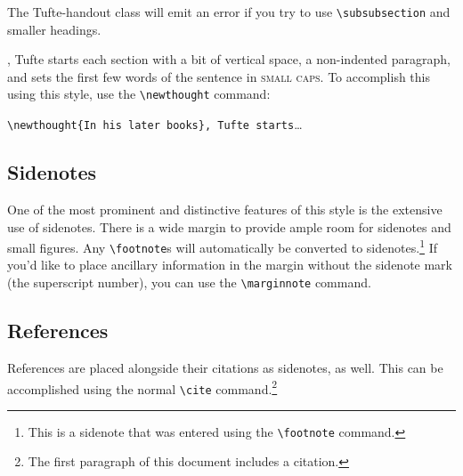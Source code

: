 \documentclass[nofonts]{tufte-handout}
\begin{document}
The Tufte-handout class will emit an error if you try to use
\Verb|\subsubsection| and smaller headings.


,\cite{Tufte2006} Tufte
starts each section with a bit of vertical space, a non-indented paragraph,
and sets the first few words of the sentence in \textsc{small caps}.  To
accomplish this using this style, use the \Verb|\newthought| command:  

\Verb|\newthought{In his later books}, Tufte starts|\ldots

\subsection{Sidenotes}\label{sec:sidenotes}
One of the most prominent and distinctive features of this style is the
extensive use of sidenotes.  There is a wide margin to provide ample room
for sidenotes and small figures.  Any \Verb|\footnote|s will automatically
be converted to sidenotes.\footnote{This is a sidenote that was entered
using the \texttt{\textbackslash footnote} command.}  If you'd like to place ancillary
information in the margin without the sidenote mark (the superscript
number), you can use the \Verb|\marginnote| command.

\subsection{References}
References are placed alongside their citations as sidenotes,
as well.  This can be accomplished using the normal \Verb|\cite|
command.\footnote{The first paragraph of this document includes a citation.}
\end{document}
